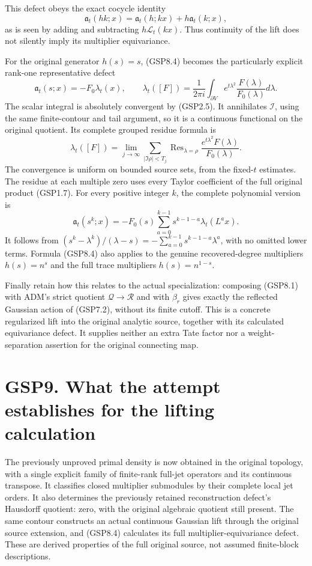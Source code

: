 This defect obeys the exact cocycle identity \[
\mathfrak a_t(hk;x)=\mathfrak a_t(h;kx)+h\mathfrak a_t(k;x),
\tag{GSP8.5}
\] as is seen by adding and subtracting \(h\mathcal L_t(kx)\). Thus
continuity of the lift does not silently imply its multiplier
equivariance.

For the original generator \(h(s)=s\), (GSP8.4) becomes the particularly
explicit rank-one representative defect \[
\mathfrak a_t(s;x)=-F_0\lambda_t(x),\qquad
\lambda_t([F])=\frac1{2\pi i}\int_{\partial V}
e^{t\lambda^2}\frac{F(\lambda)}{F_0(\lambda)}d\lambda.
\tag{GSP8.6}
\] The scalar integral is absolutely convergent by (GSP2.5). It
annihilates \(\mathcal I\), using the same finite-contour and tail
argument, so it is a continuous functional on the original quotient. Its
complete grouped residue formula is \[
\lambda_t([F])=\lim_{j\to\infty}
\sum_{|\Im\rho|<T_j}
\operatorname{Res}_{\lambda=\rho}
\frac{e^{t\lambda^2}F(\lambda)}{F_0(\lambda)}.
\tag{GSP8.7}
\] The convergence is uniform on bounded source sets, from the
fixed-\(t\) estimates. The residue at each multiple zero uses every
Taylor coefficient of the full original product (GSP1.7). For every
positive integer \(k\), the complete polynomial version is \[
\mathfrak a_t(s^k;x)
=-F_0(s)\sum_{a=0}^{k-1}s^{k-1-a}\lambda_t(L^a x).
\tag{GSP8.8}
\] It follows from
\((s^k-\lambda^k)/(\lambda-s)=-\sum_{a=0}^{k-1}s^{k-1-a}\lambda^a\),
with no omitted lower terms. Formula (GSP8.4) also applies to the
genuine recovered-degree multipliers \(h(s)=n^s\) and the full trace
multipliers \(h(s)=n^{1-s}\).

Finally retain how this relates to the actual specialization: composing
(GSP8.1) with ADM's strict quotient \(\mathcal Q\to\mathcal R\) and with
\(\beta_r\) gives exactly the reflected Gaussian action of (GSP7.2),
without its finite cutoff. This is a concrete regularized lift into the
original analytic source, together with its calculated equivariance
defect. It supplies neither an extra Tate factor nor a weight-separation
assertion for the original connecting map.

\section{GSP9. What the attempt establishes for the lifting
calculation}\label{gsp9.-what-the-attempt-establishes-for-the-lifting-calculation}

The previously unproved primal density is now obtained in the original
topology, with a single explicit family of finite-rank full-jet
operators and its continuous transpose. It classifies closed multiplier
submodules by their complete local jet orders. It also determines the
previously retained reconstruction defect's Hausdorff quotient: zero,
with the original algebraic quotient still present. The same contour
constructs an actual continuous Gaussian lift through the original
source extension, and (GSP8.4) calculates its full
multiplier-equivariance defect. These are derived properties of the full
original source, not assumed finite-block descriptions.

